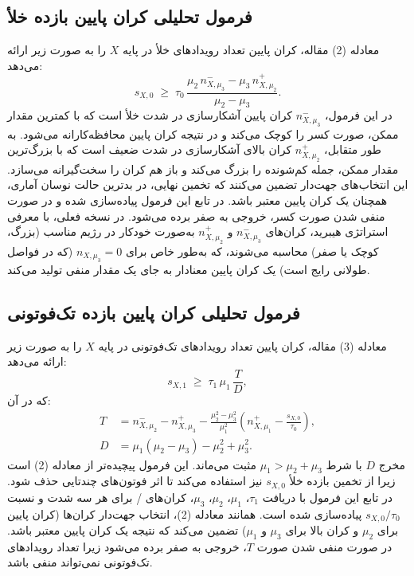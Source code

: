 \subsection{فرمول تحلیلی کران پایین بازده خلأ}

معادله (2) مقاله، کران پایین تعداد رویدادهای خلأ در پایه $X$ را به صورت زیر ارائه می‌دهد:
\begin{equation}
	s_{X,0} \;\ge\; \tau_0\,\frac{\mu_2\,n_{X,\mu_3}^{-} - \mu_3\,n_{X,\mu_2}^{+}}{\mu_2 - \mu_3}.
\end{equation}
در این فرمول، $n_{X,\mu_3}^{-}$ کران پایین آشکارسازی در شدت خلأ است که با کمترین مقدار ممکن، صورت کسر را کوچک می‌کند و در نتیجه کران پایین محافظه‌کارانه می‌شود. به طور متقابل، $n_{X,\mu_2}^{+}$ کران بالای آشکارسازی در شدت  ضعیف است که با بزرگ‌ترین مقدار ممکن، جمله کم‌شونده را بزرگ می‌کند و باز هم کران را سخت‌گیرانه می‌سازد. این انتخاب‌های جهت‌دار تضمین می‌کنند که تخمین نهایی، در بدترین حالت نوسان آماری، همچنان یک کران پایین معتبر باشد. در تابع  این فرمول پیاده‌سازی شده و در صورت منفی شدن صورت کسر، خروجی به صفر برده می‌شود. در نسخه فعلی، با معرفی استراتژی هیبرید، کران‌های $n_{X,\mu_3}^{-}$ و $n_{X,\mu_2}^{+}$ به‌صورت خودکار در رژیم مناسب (بزرگ، کوچک یا صفر) محاسبه می‌شوند، که به‌طور خاص برای $n_{X,\mu_3} = 0$ (که در فواصل طولانی رایج است) یک کران پایین معنادار به جای یک مقدار منفی تولید می‌کند.

\subsection{فرمول تحلیلی کران پایین بازده تک‌فوتونی}

معادله (3) مقاله، کران پایین تعداد رویدادهای تک‌فوتونی در پایه $X$ را به صورت زیر ارائه می‌دهد:
\begin{equation}
	s_{X,1} \;\ge\; \tau_1\,\mu_1\,\frac{T}{D},
\end{equation}
که در آن:
\begin{align}
	T &= n_{X,\mu_2}^{-} - n_{X,\mu_3}^{+} - \frac{\mu_2^2 - \mu_3^2}{\mu_1^2}\left(n_{X,\mu_1}^{+} - \frac{s_{X,0}}{\tau_0}\right), \\
	D &= \mu_1(\mu_2 - \mu_3) - \mu_2^2 + \mu_3^2.
\end{align}
مخرج $D$ با شرط $\mu_1 > \mu_2 + \mu_3$ مثبت می‌ماند. این فرمول پیچیده‌تر از معادله (2) است زیرا از تخمین بازده خلأ $s_{X,0}$ نیز استفاده می‌کند تا اثر فوتون‌های چندتایی حذف شود. در تابع  این فرمول با دریافت $\tau_1$، $\mu_1$، $\mu_2$، $\mu_3$، کران‌های / برای هر سه شدت و نسبت $s_{X,0}/\tau_0$ پیاده‌سازی شده است. همانند معادله (2)، انتخاب جهت‌دار کران‌ها (کران پایین برای $\mu_2$ و کران بالا برای $\mu_3$ و $\mu_1$) تضمین می‌کند که نتیجه یک کران پایین معتبر باشد. در صورت منفی شدن صورت $T$، خروجی به صفر برده می‌شود زیرا تعداد رویدادهای تک‌فوتونی نمی‌تواند منفی باشد.

